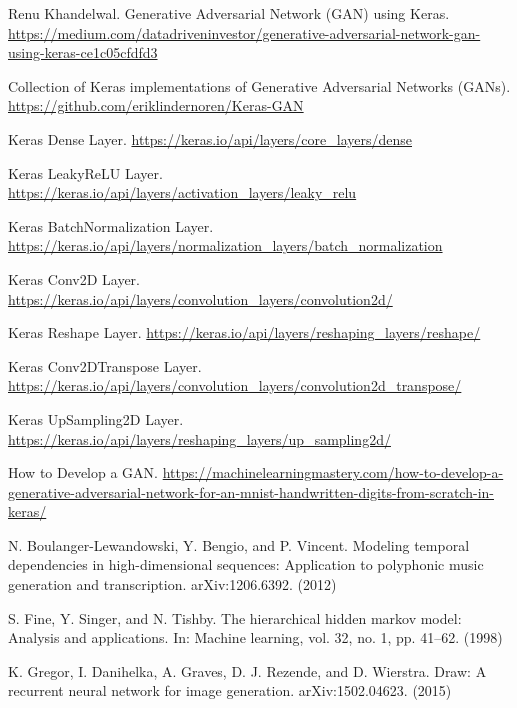 \begin{thebibliography}{9}
 Renu Khandelwal. Generative Adversarial Network (GAN) using Keras.
\href{https://medium.com/datadriveninvestor/generative-adversarial-network-gan-using-keras-ce1c05cfdfd3}{https://medium.com/datadriveninvestor/generative-adversarial-network-gan-using-keras-ce1c05cfdfd3}

 Collection of Keras implementations of Generative Adversarial Networks (GANs).
\href{https://github.com/eriklindernoren/Keras-GAN}{https://github.com/eriklindernoren/Keras-GAN}

 Keras Dense Layer.
\href{https://keras.io/api/layers/core\_layers/dense}{https://keras.io/api/layers/core\_layers/dense}

 Keras LeakyReLU Layer.
\href{https://keras.io/api/layers/activation\_layers/leaky\_relu}{https://keras.io/api/layers/activation\_layers/leaky\_relu}

 Keras BatchNormalization Layer.
\href{https://keras.io/api/layers/normalization\_layers/batch\_normalization}{https://keras.io/api/layers/normalization\_layers/batch\_normalization}

 Keras Conv2D Layer.
\href{https://keras.io/api/layers/convolution\_layers/convolution2d/}{https://keras.io/api/layers/convolution\_layers/convolution2d/}

 Keras Reshape Layer.
\href{https://keras.io/api/layers/reshaping\_layers/reshape/}{https://keras.io/api/layers/reshaping\_layers/reshape/}

 Keras Conv2DTranspose Layer.
\href{https://keras.io/api/layers/convolution\_layers/convolution2d\_transpose/}{https://keras.io/api/layers/convolution\_layers/convolution2d\_transpose/}

 Keras UpSampling2D Layer.
\href{https://keras.io/api/layers/reshaping\_layers/up\_sampling2d/}{https://keras.io/api/layers/reshaping\_layers/up\_sampling2d/}


 How to Develop a GAN. 
\href{https://machinelearningmastery.com/how-to-develop-a-generative-adversarial-network-for-an-mnist-handwritten-digits-from-scratch-in-keras/}{https://machinelearningmastery.com/how-to-develop-a-generative-adversarial-network-for-an-mnist-handwritten-digits-from-scratch-in-keras/}

 N. Boulanger-Lewandowski, Y. Bengio, and P. Vincent. Modeling temporal dependencies in high-dimensional
sequences: Application to polyphonic music generation and transcription. arXiv:1206.6392. (2012)

 S. Fine, Y. Singer, and N. Tishby. The hierarchical hidden markov model: Analysis and applications. In: Machine
learning, vol. 32, no. 1, pp. 41–62. (1998)

 K. Gregor, I. Danihelka, A. Graves, D. J. Rezende, and D. Wierstra. Draw: A recurrent neural network for image generation. arXiv:1502.04623. (2015)

\end{thebibliography}